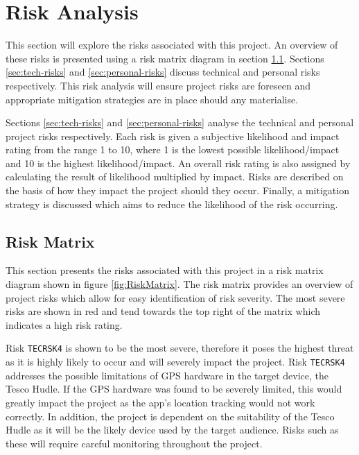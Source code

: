 \documentclass[11pt,a4paper]{article}
\begin{document}
\section{Risk Analysis}
\label{sec:risk-analysis}

This section will explore the risks associated with this project. An overview of these risks is presented using a risk matrix diagram in section \ref{sec:risk-matrix}. Sections \ref{sec:tech-risks} and \ref{sec:personal-risks} discuss technical and personal risks respectively. This risk analysis will ensure project risks are foreseen and appropriate mitigation strategies are in place should any materialise.

Sections \ref{sec:tech-risks} and \ref{sec:personal-risks} analyse the technical and personal project risks respectively. Each risk is given a subjective likelihood and impact rating from the range 1 to 10, where 1 is the lowest possible likelihood/impact and 10 is the highest likelihood/impact. An overall risk rating is also assigned by calculating the result of likelihood multiplied by impact. Risks are described on the basis of how they impact the project should they occur. Finally, a mitigation strategy is discussed which aims to reduce the likelihood of the risk occurring.

\subsection{Risk Matrix}
\label{sec:risk-matrix}

This section presents the risks associated with this project in a risk matrix diagram shown in figure \ref{fig:RiskMatrix}. The risk matrix provides an overview of project risks which allow for easy identification of risk severity. The most severe risks are shown in red and tend towards the top right of the matrix which indicates a high risk rating.

Risk \texttt{TECRSK4} is shown to be the most severe, therefore it poses the highest threat as it is highly likely to occur and will severely impact the project. Risk \texttt{TECRSK4}  addresses the possible limitations of GPS hardware in the target device, the Tesco Hudle. If the GPS hardware was found to be severely limited, this would greatly impact the project as the app's location tracking would not work correctly. In addition, the project is dependent on the suitability of the Tesco Hudle as it will be the likely device used by the target audience. Risks such as these will require careful monitoring throughout the project. 
\end{document}
